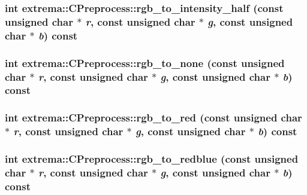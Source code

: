 \hypertarget{classextrema_1_1CPreprocess_791038e205769e2ca237b090e3ad142e}{
\subsubsection[rgb\_\-to\_\-intensity\_\-half]{\setlength{\rightskip}{0pt plus 5cm}int extrema::CPreprocess::rgb\_\-to\_\-intensity\_\-half (const unsigned char $\ast$ {\em r}, const unsigned char $\ast$ {\em g}, const unsigned char $\ast$ {\em b}) const}}
\label{classextrema_1_1CPreprocess_791038e205769e2ca237b090e3ad142e}


\hypertarget{classextrema_1_1CPreprocess_9d696cdf40c918c33fbb55188e88c1fb}{
\subsubsection[rgb\_\-to\_\-none]{\setlength{\rightskip}{0pt plus 5cm}int extrema::CPreprocess::rgb\_\-to\_\-none (const unsigned char $\ast$ {\em r}, const unsigned char $\ast$ {\em g}, const unsigned char $\ast$ {\em b}) const}}
\label{classextrema_1_1CPreprocess_9d696cdf40c918c33fbb55188e88c1fb}


\hypertarget{classextrema_1_1CPreprocess_96132275c8f3491fff510235e25d9b2a}{
\subsubsection[rgb\_\-to\_\-red]{\setlength{\rightskip}{0pt plus 5cm}int extrema::CPreprocess::rgb\_\-to\_\-red (const unsigned char $\ast$ {\em r}, const unsigned char $\ast$ {\em g}, const unsigned char $\ast$ {\em b}) const}}
\label{classextrema_1_1CPreprocess_96132275c8f3491fff510235e25d9b2a}


\hypertarget{classextrema_1_1CPreprocess_845037c3f5a01296bad815c96730b50f}{
\subsubsection[rgb\_\-to\_\-redblue]{\setlength{\rightskip}{0pt plus 5cm}int extrema::CPreprocess::rgb\_\-to\_\-redblue (const unsigned char $\ast$ {\em r}, const unsigned char $\ast$ {\em g}, const unsigned char $\ast$ {\em b}) const}}
\label{classextrema_1_1CPreprocess_845037c3f5a01296bad815c96730b50f}


